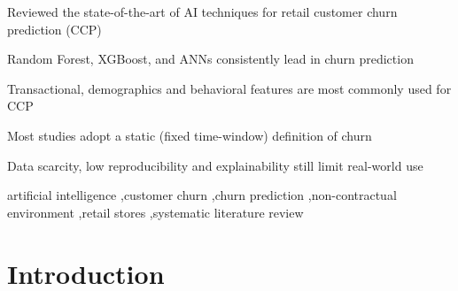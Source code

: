 \documentclass[preprint,12pt]{elsarticle}
\begin{document}
\begin{frontmatter}
\begin{abstract}




\end{abstract}



\begin{highlights}
\item Reviewed the state-of-the-art of AI techniques for retail customer churn prediction (CCP)
\item Random Forest, XGBoost, and ANNs consistently lead in churn prediction
\item Transactional, demographics and behavioral features are most commonly used for CCP
\item Most studies adopt a static (fixed time-window) definition of churn
\item Data scarcity, low reproducibility and explainability still limit real-world use 
\end{highlights}

\begin{keyword}
artificial intelligence \sep customer churn \sep churn prediction \sep non-contractual environment \sep retail stores \sep systematic literature review  
\end{keyword}

\end{frontmatter}


\section{Introduction}
\label{sec:introduction}
\end{document}
